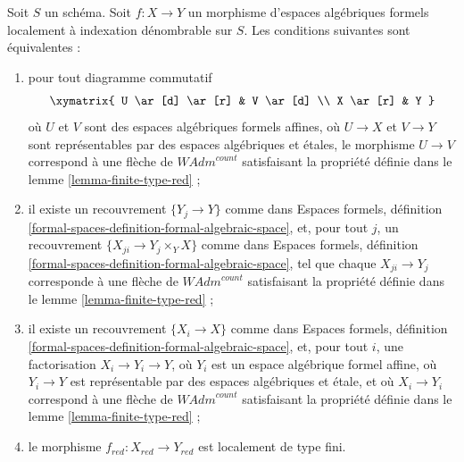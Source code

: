 \begin{lemma}
\label{lemma-finite-type-red-morphisms}
Soit $S$ un schéma. Soit $f : X \to Y$ un morphisme d'espaces algébriques
formels localement à indexation dénombrable sur $S$.
Les conditions suivantes sont équivalentes :
\begin{enumerate}
\item pour tout diagramme commutatif
$$
\xymatrix{
U \ar[d] \ar[r] & V \ar[d] \\
X \ar[r] & Y
}
$$
où $U$ et $V$ sont des espaces algébriques formels affines, où $U \to X$ et
$V \to Y$ sont représentables par des espaces algébriques et étales, le
morphisme $U \to V$ correspond à une flèche de $\textit{WAdm}^{count}$
satisfaisant la propriété définie dans le lemme \ref{lemma-finite-type-red} ;
\item il existe un recouvrement $\{Y_j \to Y\}$ comme dans Espaces formels,
définition \ref{formal-spaces-definition-formal-algebraic-space},
et, pour tout $j$, un recouvrement $\{X_{ji} \to Y_j \times_Y X\}$ comme dans
Espaces formels, définition
\ref{formal-spaces-definition-formal-algebraic-space}, tel que chaque
$X_{ji} \to Y_j$ corresponde à une flèche de $\textit{WAdm}^{count}$
satisfaisant la propriété définie dans le lemme \ref{lemma-finite-type-red} ;
\item il existe un recouvrement $\{X_i \to X\}$ comme dans Espaces formels,
définition \ref{formal-spaces-definition-formal-algebraic-space}, et, pour tout
$i$, une factorisation $X_i \to Y_i \to Y$, où $Y_i$ est un espace algébrique
formel affine, où $Y_i \to Y$ est représentable par des espaces algébriques et
étale, et où $X_i \to Y_i$ correspond à une flèche de
$\textit{WAdm}^{count}$ satisfaisant la propriété définie dans le
lemme \ref{lemma-finite-type-red} ;
\item le morphisme $f_{red} : X_{red} \to Y_{red}$ est localement de type fini.
\end{enumerate}
\end{lemma}


